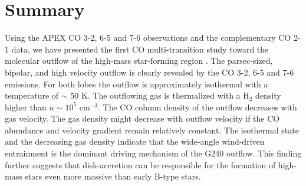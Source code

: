 \section{Summary}\label{summary}

Using the APEX CO 3-2, 6-5 and 7-6 observations and the complementary CO 2-1 data, we have presented the first CO multi-transition study toward the molecular outflow of the high-mass star-forming region . The parsec-sized, bipolar, and high velocity outflow is clearly revealed by the CO 3-2, 6-5 and 7-6 emissions. For both lobes the outflow is approximately isothermal with a temperature of $\sim$ 50 K. The outflowing gas is thermalized with a H$_2$ density higher than $n \sim 10^5$ cm$^{-3}$. The CO column density of the outflow decreases with gas velocity. The gas density might decrease with outflow velocity if the CO abundance and velocity gradient remain relatively constant. The isothermal state and the decreasing gas density indicate that the wide-angle wind-driven entrainment is the dominant driving mechanism of the G240 outflow. This finding further suggests that disk-accretion can be responsible for the formation of high-mass stars even more massive than early B-type stars.

